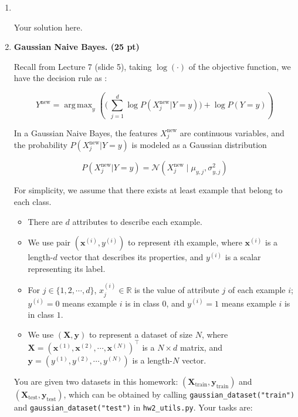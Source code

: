 \documentclass{article}
\newcommand{\bx}{{\boldsymbol x}}
\DeclareMathOperator*{\argmax}{arg\,max}
\theoremstyle{definition}
\theoremstyle{remark}
\newenvironment{Q}
        {%
          \clearpage
          \item
        }
        {%
          \phantom{s} %
          \bigskip
        }
\begin{document}
\begin{enumerate}[font={\Large\bfseries},left=0pt]
\begin{Q}
\begin{enumerate}
\end{enumerate}
    
\end{Q}
\begin{tcolorbox}
    Your solution here.
\end{tcolorbox}
\begin{Q}
\textbf{\Large  Gaussian Naive Bayes. (25 pt)}

Recall from Lecture 7 (slide 5), taking $\log(\cdot)$ of the objective function, we have the decision rule as :

$$
   Y^{\text{new}} = \argmax_y \left( \biggl(\, \sum_{j=1}^d \log P(X_j^{\text{new}} | Y = y) \biggr) +\log P(Y=y) \right)
$$

In a Gaussian Naive Bayes, the features $X^{\text{new}}_j$ are continuous variables, and the probability $P(X^{\text{new}}_j|Y=y)$ is modeled as a Gaussian distribution 

$$
P(X^{\text{new}}_j|Y=y)= \mathcal{N}(X^{\text{new}}_j\mid\mu_{y,j},\sigma^2_{y,j})
$$

For simplicity, we assume that there exists at least example that belong to each class.
\begin{itemize}
    \item There are $d$ attributes to describe each example.
    \item We use pair $(\bm{x}^{(i)},y^{(i)})$ to represent $i$th example, where $\bm{x}^{(i)}$ is a length-$d$ vector that describes its properties, and $y^{(i)}$ is a scalar representing its label.
    \item For $j\in\{1,2,\cdots,d\}$, $x^{(i)}_j\in \mathbb{R}$ is the value of attribute $j$ of each example $i$; $y^{(i)}=0$ means example $i$ is in class $0$, and $y^{(i)}=1$ means example $i$ is in class $1$. 
    \item We use $(\bm{X},\bm{y})$ to represent a dataset of size $N$, where $\bm{X}=\left(\bx^{(1)}, \bx^{(2)},\cdots,\bx^{(N)}\right)^\top$ is a $N\times d$ matrix, and $\bm{y}=\left(y^{(1)},y^{(2)},\cdots,y^{(N)}\right)$ is a length-$N$ vector.
\end{itemize}

You are given two datasets in this homework: $(\bm{X}_\mathrm{train},\bm{y}_\mathrm{train})$ and $(\bm{X}_\mathrm{test},\bm{y}_\mathrm{test})$, which can be obtained by calling \texttt{gaussian\_dataset("train")} and \texttt{gaussian\_dataset("test")} in \texttt{hw2\_utils.py}. Your tasks are:

\begin{enumerate}


\end{enumerate}
\end{Q}
\end{enumerate}
\end{document}
